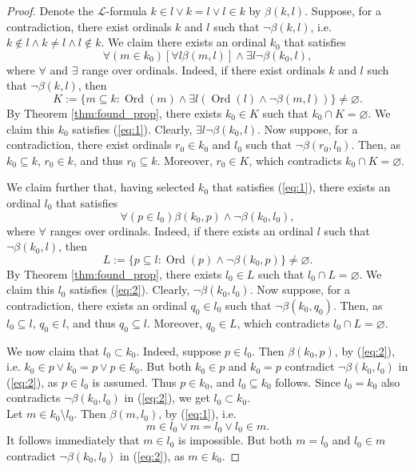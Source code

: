 \setcounter{equation}{0}
\begin{proof}
    \leanok
    Denote the $\mathcal{L}$-formula $k \in l \lor k = l \lor l \in k$ by $\beta (k,l)$. 
    Suppose, for a contradiction, there exist ordinals $k$ and $l$ such that $\neg \beta (k,l)$, 
    i.e. $k \notin l \land k \neq l \land l \notin k$. 
    We claim there exists an ordinal $k_0$ that satisfies
    \begin{equation}\label{eq:1}
    \forall(m \in k_0)[\forall l \beta(m,l)] \land \exists l \neg \beta(k_0,l),
    \end{equation}
    where $\forall$ and $\exists$ range over ordinals. 
    Indeed, if there exist ordinals $k$ and $l$ such that $\neg \beta (k,l)$, then 
    $$K := \{m \subseteq k : \operatorname{Ord}(m) \land \exists l (\operatorname{Ord}(l) \land 
    \neg \beta (m,l))\} \neq \varnothing.$$
    By Theorem \ref{thm:found_prop}, there exists $k_0 \in K$ such that $k_0 \cap K = \varnothing$. 
    We claim this $k_0$ satisfies (\ref{eq:1}). 
    Clearly, $\exists l \neg \beta(k_0,l)$. 
    Now suppose, for a contradiction, there exist ordinals $r_0 \in k_0$ and $l_0$ such that 
    $\neg \beta (r_0,l_0)$. 
    Then, as $k_0 \subseteq k$, $r_0 \in k$, and thus $r_0 \subseteq k$. 
    Moreover, $r_0 \in K$, which contradicts $k_0 \cap K = \varnothing$. 
    
    We claim further that, having selected $k_0$ that satisfies (\ref{eq:1}), 
    there exists an ordinal $l_0$ that satisfies 
    \begin{equation}\label{eq:2}
    \forall(p \in l_0)\beta(k_0,p) \land \neg \beta(k_0,l_0),
    \end{equation}
    where $\forall$ ranges over ordinals. 
    Indeed, if there exists an ordinal $l$ such that $\neg \beta (k_0,l)$, then 
    $$L := \{p \subseteq l : \operatorname{Ord}(p) \land \neg \beta (k_0, p)\} \neq \varnothing.$$
    By Theorem \ref{thm:found_prop}, there exists $l_0 \in L$ such that $l_0 \cap L = \varnothing$. 
    We claim this $l_0$ satisfies (\ref{eq:2}). Clearly, $\neg \beta(k_0,l_0)$. 
    Now suppose, for a contradiction, there exists an ordinal $q_0 \in l_0$ such that 
    $\neg \beta (k_0, q_0)$. 
    Then, as $l_0 \subseteq l$, $q_0 \in l$, and thus $q_0 \subseteq l$. 
    Moreover, $q_0 \in L$, which contradicts $l_0 \cap L = \varnothing$. 
    
    We now claim that $l_0 \subset k_0$. Indeed, suppose $p \in l_0$. 
    Then $\beta (k_0, p)$, by (\ref{eq:2}), i.e. $k_0 \in p \lor k_0 = p \lor p \in k_0$. 
    But both $k_0 \in p$ and $k_0 = p$ contradict $\neg \beta(k_0,l_0)$ in (\ref{eq:2}), 
    as $p \in l_0$ is assumed. Thus $p \in k_0$, and $l_0 \subseteq k_0$ follows. 
    Since $l_0 = k_0$ also contradicts $\neg \beta(k_0,l_0)$ in (\ref{eq:2}), 
    we get $l_0 \subset k_0$. \\
    
    Let $m \in k_0 \setminus l_0$. Then $\beta(m, l_0)$, by (\ref{eq:1}), i.e.
    $$m \in l_0 \lor m = l_0 \lor l_0 \in m.$$
    It follows immediately that $m \in l_0$ is impossible. 
    But both $m=l_0$ and $l_0 \in m$ contradict $\neg \beta(k_0,l_0)$ in (\ref{eq:2}), 
    as $m \in k_0$.
\end{proof}

